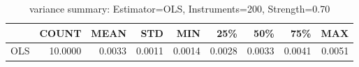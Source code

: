 \begin{table}[ht]
\centering
\caption{variance summary: Estimator=OLS, Instruments=200, Strength=0.70}
\begin{tabular}{lrrrrrrrr}
\toprule
 & COUNT & MEAN & STD & MIN & 25\% & 50\% & 75\% & MAX \\
\midrule
OLS & 10.0000 & 0.0033 & 0.0011 & 0.0014 & 0.0028 & 0.0033 & 0.0041 & 0.0051 \\
\bottomrule
\end{tabular}
\end{table}
